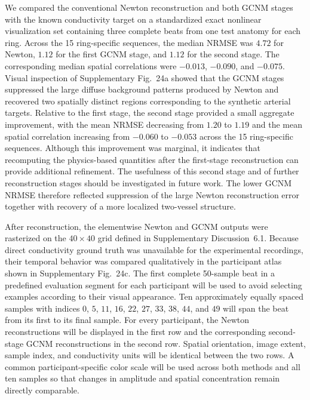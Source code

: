 \documentclass[11pt]{article}
\begin{document}
We compared the conventional Newton reconstruction and both GCNM stages with the known conductivity target on a standardized exact nonlinear visualization set containing three complete beats from one test anatomy for each ring.
Across the 15 ring-specific sequences, the median NRMSE was $4.72$ for Newton, $1.12$ for the first GCNM stage, and $1.12$ for the second stage.
The corresponding median spatial correlations were $-0.013$, $-0.090$, and $-0.075$.
Visual inspection of Supplementary Fig.~24a showed that the GCNM stages suppressed the large diffuse background patterns produced by Newton and recovered two spatially distinct regions corresponding to the synthetic arterial targets.
Relative to the first stage, the second stage provided a small aggregate improvement, with the mean NRMSE decreasing from $1.20$ to $1.19$ and the mean spatial correlation increasing from $-0.060$ to $-0.053$ across the 15 ring-specific sequences.
Although this improvement was marginal, it indicates that recomputing the physics-based quantities after the first-stage reconstruction can provide additional refinement.
The usefulness of this second stage and of further reconstruction stages should be investigated in future work.
The lower GCNM NRMSE therefore reflected suppression of the large Newton reconstruction error together with recovery of a more localized two-vessel structure.

After reconstruction, the elementwise Newton and GCNM outputs were rasterized on the $40\times40$ grid defined in Supplementary Discussion~6.1.
Because direct conductivity ground truth was unavailable for the experimental recordings, their temporal behavior was compared qualitatively in the participant atlas shown in Supplementary Fig.~24c.
The first complete 50-sample beat in a predefined evaluation segment for each participant will be used to avoid selecting examples according to their visual appearance.
Ten approximately equally spaced samples with indices $0$, $5$, $11$, $16$, $22$, $27$, $33$, $38$, $44$, and $49$ will span the beat from its first to its final sample.
For every participant, the Newton reconstructions will be displayed in the first row and the corresponding second-stage GCNM reconstructions in the second row.
Spatial orientation, image extent, sample index, and conductivity units will be identical between the two rows.
A common participant-specific color scale will be used across both methods and all ten samples so that changes in amplitude and spatial concentration remain directly comparable.
\end{document}
